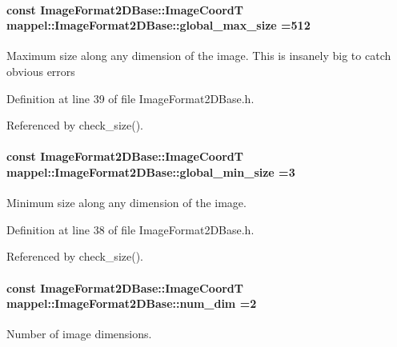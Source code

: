 \paragraph[{\texorpdfstring{global\+\_\+max\+\_\+size}{global_max_size}}]{\setlength{\rightskip}{0pt plus 5cm}const {\bf Image\+Format2\+D\+Base\+::\+Image\+CoordT} mappel\+::\+Image\+Format2\+D\+Base\+::global\+\_\+max\+\_\+size =512\hspace{0.3cm}{\ttfamily [static]}}\hypertarget{classmappel_1_1ImageFormat2DBase_a11c9bb87930f597dff17e9923b73bf5e}{}\label{classmappel_1_1ImageFormat2DBase_a11c9bb87930f597dff17e9923b73bf5e}
Maximum size along any dimension of the image. This is insanely big to catch obvious errors 

Definition at line 39 of file Image\+Format2\+D\+Base.\+h.



Referenced by check\+\_\+size().

\paragraph[{\texorpdfstring{global\+\_\+min\+\_\+size}{global_min_size}}]{\setlength{\rightskip}{0pt plus 5cm}const {\bf Image\+Format2\+D\+Base\+::\+Image\+CoordT} mappel\+::\+Image\+Format2\+D\+Base\+::global\+\_\+min\+\_\+size =3\hspace{0.3cm}{\ttfamily [static]}}\hypertarget{classmappel_1_1ImageFormat2DBase_a1149e8545d3cfaa40c2f3bc02e3223b2}{}\label{classmappel_1_1ImageFormat2DBase_a1149e8545d3cfaa40c2f3bc02e3223b2}
Minimum size along any dimension of the image. 

Definition at line 38 of file Image\+Format2\+D\+Base.\+h.



Referenced by check\+\_\+size().

\paragraph[{\texorpdfstring{num\+\_\+dim}{num_dim}}]{\setlength{\rightskip}{0pt plus 5cm}const {\bf Image\+Format2\+D\+Base\+::\+Image\+CoordT} mappel\+::\+Image\+Format2\+D\+Base\+::num\+\_\+dim =2\hspace{0.3cm}{\ttfamily [static]}}\hypertarget{classmappel_1_1ImageFormat2DBase_a9c29fcaf30faffc77b41ba556ebb0127}{}\label{classmappel_1_1ImageFormat2DBase_a9c29fcaf30faffc77b41ba556ebb0127}
Number of image dimensions. 

